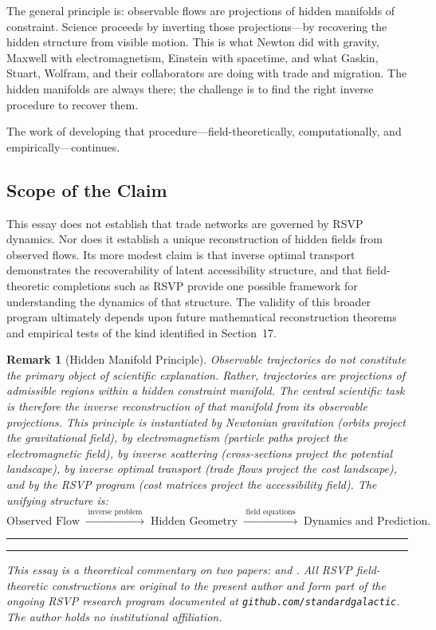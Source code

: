 \documentclass[12pt]{article}
\newtheorem{remark}{Remark}[section]
\begin{document}
The general principle is: observable flows are projections of hidden manifolds of constraint. Science proceeds by inverting those projections---by recovering the hidden structure from visible motion. This is what Newton did with gravity, Maxwell with electromagnetism, Einstein with spacetime, and what Gaskin, Stuart, Wolfram, and their collaborators are doing with trade and migration. The hidden manifolds are always there; the challenge is to find the right inverse procedure to recover them.

The work of developing that procedure---field-theoretically, computationally, and empirically---continues.

\subsection*{Scope of the Claim}

This essay does not establish that trade networks are governed by RSVP dynamics. Nor does it establish a unique reconstruction of hidden fields from observed flows. Its more modest claim is that inverse optimal transport demonstrates the recoverability of latent accessibility structure, and that field-theoretic completions such as RSVP provide one possible framework for understanding the dynamics of that structure. The validity of this broader program ultimately depends upon future mathematical reconstruction theorems and empirical tests of the kind identified in Section~17.

\begin{remark}[Hidden Manifold Principle]
Observable trajectories do not constitute the primary object of scientific explanation. Rather, trajectories are projections of admissible regions within a hidden constraint manifold. The central scientific task is therefore the inverse reconstruction of that manifold from its observable projections. This principle is instantiated by Newtonian gravitation (orbits project the gravitational field), by electromagnetism (particle paths project the electromagnetic field), by inverse scattering (cross-sections project the potential landscape), by inverse optimal transport (trade flows project the cost landscape), and by the RSVP program (cost matrices project the accessibility field). The unifying structure is:
\[
\text{Observed Flow} \;\xrightarrow{\;\text{inverse problem}\;}\; \text{Hidden Geometry} \;\xrightarrow{\;\text{field equations}\;}\; \text{Dynamics and Prediction.}
\]
\end{remark}

\vspace{2em}
\hrule
\vspace{1em}



\vspace{1em}
\hrule
\vspace{1em}

{\small\noindent\textit{This essay is a theoretical commentary on two papers: \citet{gaskin2026} and \citet{stuart2019}. All RSVP field-theoretic constructions are original to the present author and form part of the ongoing RSVP research program documented at \texttt{github.com/standardgalactic}. The author holds no institutional affiliation.}}
\end{document}
